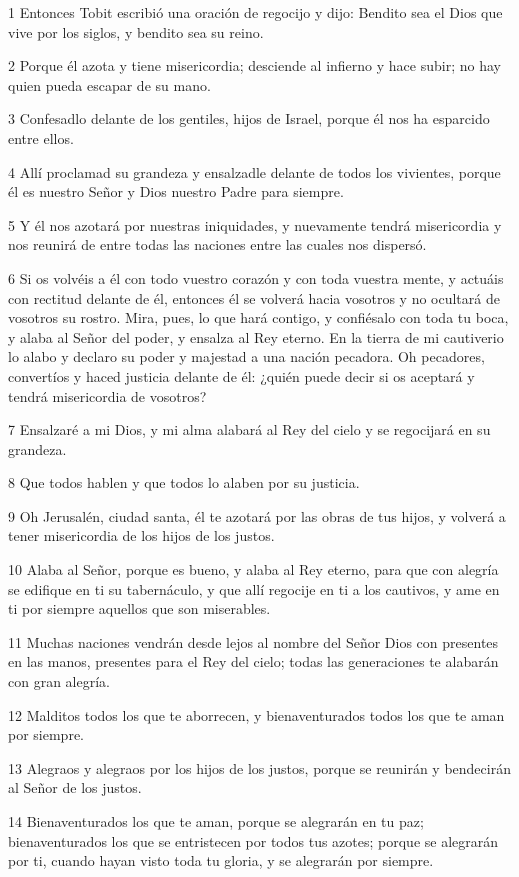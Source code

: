 \par 1 Entonces Tobit escribió una oración de regocijo y dijo: Bendito sea el Dios que vive por los siglos, y bendito sea su reino.
\par 2 Porque él azota y tiene misericordia; desciende al infierno y hace subir; no hay quien pueda escapar de su mano.
\par 3 Confesadlo delante de los gentiles, hijos de Israel, porque él nos ha esparcido entre ellos.
\par 4 Allí proclamad su grandeza y ensalzadle delante de todos los vivientes, porque él es nuestro Señor y Dios nuestro Padre para siempre.
\par 5 Y él nos azotará por nuestras iniquidades, y nuevamente tendrá misericordia y nos reunirá de entre todas las naciones entre las cuales nos dispersó.
\par 6 Si os volvéis a él con todo vuestro corazón y con toda vuestra mente, y actuáis con rectitud delante de él, entonces él se volverá hacia vosotros y no ocultará de vosotros su rostro. Mira, pues, lo que hará contigo, y confiésalo con toda tu boca, y alaba al Señor del poder, y ensalza al Rey eterno. En la tierra de mi cautiverio lo alabo y declaro su poder y majestad a una nación pecadora. Oh pecadores, convertíos y haced justicia delante de él: ¿quién puede decir si os aceptará y tendrá misericordia de vosotros?
\par 7 Ensalzaré a mi Dios, y mi alma alabará al Rey del cielo y se regocijará en su grandeza.
\par 8 Que todos hablen y que todos lo alaben por su justicia.
\par 9 Oh Jerusalén, ciudad santa, él te azotará por las obras de tus hijos, y volverá a tener misericordia de los hijos de los justos.
\par 10 Alaba al Señor, porque es bueno, y alaba al Rey eterno, para que con alegría se edifique en ti su tabernáculo, y que allí regocije en ti a los cautivos, y ame en ti por siempre aquellos que son miserables.
\par 11 Muchas naciones vendrán desde lejos al nombre del Señor Dios con presentes en las manos, presentes para el Rey del cielo; todas las generaciones te alabarán con gran alegría.
\par 12 Malditos todos los que te aborrecen, y bienaventurados todos los que te aman por siempre.
\par 13 Alegraos y alegraos por los hijos de los justos, porque se reunirán y bendecirán al Señor de los justos.
\par 14 Bienaventurados los que te aman, porque se alegrarán en tu paz; bienaventurados los que se entristecen por todos tus azotes; porque se alegrarán por ti, cuando hayan visto toda tu gloria, y se alegrarán por siempre.
